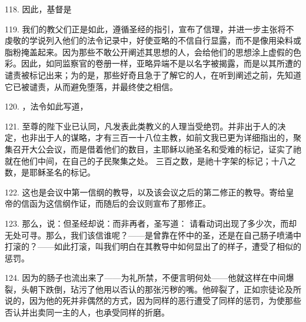 118. 因此，基督是\par

119. 我们的教父们正是如此，遵循圣经的指引，宣布了信理，并进一步主张将不虔敬的学说列入他们的法令记录中，好使亚略的不信自行显露，而不是像用染料或脂粉掩盖起来。因为那些不敢公开阐述其思想的人，会给他们的思想涂上虚假的色彩。因此，如同监察官的卷册一样，亚略异端不是以名字被揭露，而是以其所遭的谴责被标记出来；为的是，那些好奇且急于了解它的人，在听到阐述之前，先知道它已被谴责，从而避免堕落，并最终使之相信。\par

120. ，法令如此写道，\par

121. 至尊的陛下业已认同，凡发表此类教义的人理当受绝罚。并非出于人的决定，也非出于人的谋略，才有三百一十八位主教，如前文我已更为详细指出的，聚集召开大公会议，而是借着他们的数目，主耶稣以祂圣名和受难的标记，证实了祂就在他们中间，在自己的子民聚集之处。 三百之数，是祂十字架的标记；十八之数，是耶稣圣名的标记。\par

122. 这也是会议中第一信纲的教导，以及该会议之后的第二修正的教导。寄给皇帝的信函为这信纲作证，而随后的会议则宣布了那修正。\par

\par

123. 那么，说：但圣经却说：而非再者，圣写道： 请看动词出现了多少次，而却无处可寻。那么，我们该信谁呢？——是曾靠在怀中的圣，还是在自己肠子喷涌中打滚的？——如此打滚，叫我们明白在其教导中如何显出了的样子，遭受了相似的惩罚。\par

124. 因为的肠子也流出来了——为礼所禁，不便言明何处——他就这样在中间爆裂，头朝下跌倒，玷污了他用以否认的那张污秽的嘴。他碎裂了，正如宗徒论及所说的，因为他的死并非偶然的方式，因为同样的恶行遭受了同样的惩罚，为使那些否认并出卖同一主的人，也承受同样的折磨。\par

